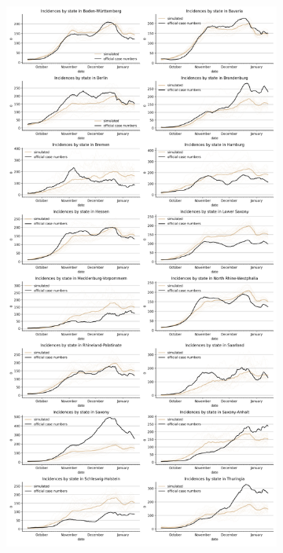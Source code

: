 \begin{figure}[ht]
\centering
\begin{subfigure}{.6\textwidth}
  \includegraphics[width=0.9 \textwidth]{../figures/results/figures/incidences_by_group/state/full_fall_baseline_new_known_case}
\end{subfigure}%
\begin{subfigure}{.6\textwidth}

\end{subfigure}
\end{figure}
